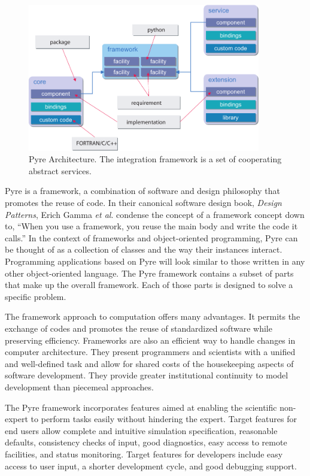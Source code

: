 \begin{figure}[htbp]
  \includegraphics[width=4in]{intro/figs/pyre_overview}
  \caption{Pyre Architecture. The integration framework is a set of
    cooperating abstract services.}
  \label{fig:Pyre:Architecture}
\end{figure}

Pyre is a framework, a combination of software and design philosophy
that promotes the reuse of code. In their canonical software design
book, \emph{Design Patterns}, Erich Gamma \textit{et al}. condense
the concept of a framework concept down to, ``When you use a framework,
you reuse the main body and write the code it calls.'' In the context
of frameworks and object-oriented programming, Pyre can be thought
of as a collection of classes and the way their instances interact.
Programming applications based on Pyre will look similar to those
written in any other object-oriented language. The Pyre framework
contains a subset of parts that make up the overall framework. Each
of those parts is designed to solve a specific problem.

The framework approach to computation offers many advantages. It permits
the exchange of codes and promotes the reuse of standardized software
while preserving efficiency. Frameworks are also an efficient way
to handle changes in computer architecture. They present programmers
and scientists with a unified and well-defined task and allow for
shared costs of the housekeeping aspects of software development.
They provide greater institutional continuity to model development
than piecemeal approaches.

The Pyre framework incorporates features aimed at enabling the
scientific non-expert to perform tasks easily without hindering the
expert. Target features for end users allow complete and intuitive
simulation specification, reasonable defaults, consistency checks of
input, good diagnostics, easy access to remote facilities, and status
monitoring. Target features for developers include easy access to user
input, a shorter development cycle, and good debugging support.


